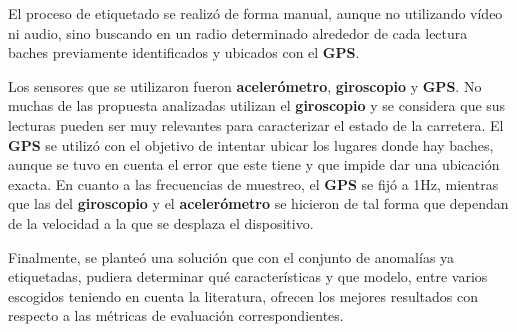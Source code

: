 	El proceso de etiquetado se realizó de forma manual, aunque no utilizando vídeo ni audio, sino buscando en un radio determinado alrededor de cada
	lectura baches previamente identificados y ubicados con el \textbf{GPS}.

	Los sensores que se utilizaron fueron \textbf{acelerómetro}, \textbf {giroscopio} y \textbf{GPS}. No muchas de las propuesta analizadas utilizan
	el \textbf{giroscopio} y se considera que sus lecturas pueden ser muy relevantes para caracterizar el estado de la carretera. El \textbf{GPS}
	se utilizó con el objetivo de intentar ubicar los lugares donde hay baches, aunque se tuvo en cuenta el error que este tiene y que impide dar
	una ubicación exacta. En cuanto a las frecuencias de muestreo, el \textbf{GPS} se fijó a 1Hz, mientras que las del \textbf{giroscopio} y el
	\textbf{acelerómetro} se hicieron de tal forma que dependan de la velocidad a la que se desplaza el dispositivo.

	Finalmente, se planteó una solución que con el conjunto de anomalías ya etiquetadas, pudiera determinar qué características y que modelo, entre
	varios escogidos teniendo en cuenta la literatura, ofrecen los mejores resultados con respecto a las métricas de evaluación correspondientes.
	

